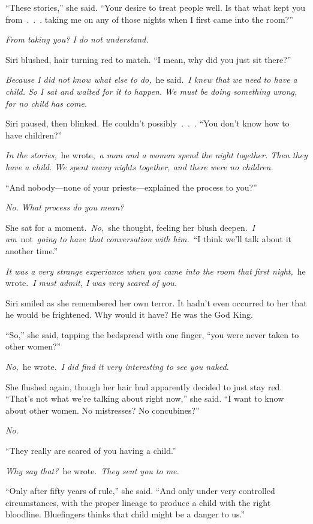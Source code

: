 “These stories,” she said. “Your desire to treat people well. Is that what kept you from~.~.~. taking me on any of those nights when I first came into the room?”

\textit{From taking you? I do not understand.}

Siri blushed, hair turning red to match. “I mean, why did you just sit there?”

\textit{Because I did not know what else to do,}~he said.~\textit{I knew that we need to have a child. So I sat and waited for it to happen. We must be doing something wrong, for no child has come.}

Siri paused, then blinked. He couldn’t possibly~.~.~. “You don’t know how to have children?”

\textit{In the stories,}~he wrote,~\textit{a man and a woman spend the night together. Then they have a child. We spent many nights together, and there were no children.}

“And nobody—none of your priests—explained the process to you?”

\textit{No. What process do you mean?}

She sat for a moment.~\textit{No,}~she thought, feeling her blush deepen.~\textit{I am}~not~\textit{going to have that conversation with him.}~“I think we’ll talk about it another time.”

\textit{It was a very strange experiance when you came into the room that first night,}~he wrote.~\textit{I must admit, I was very scared of you.}

Siri smiled as she remembered her own terror. It hadn’t even occurred to her that he would be frightened. Why would it have? He was the God King.

“So,” she said, tapping the bedspread with one finger, “you were never taken to other women?”

\textit{No,}~he wrote.~\textit{I did find it very interesting to see you naked.}

She flushed again, though her hair had apparently decided to just stay red. “That’s not what we’re talking about right now,” she said. “I want to know about other women. No mistresses? No concubines?”

\textit{No.}

“They really are scared of you having a child.”

\textit{Why say that?}~he wrote.~\textit{They sent you to me.}

“Only after fifty years of rule,” she said. “And only under very controlled circumstances, with the proper lineage to produce a child with the right bloodline. Bluefingers thinks that child might be a danger to us.”

